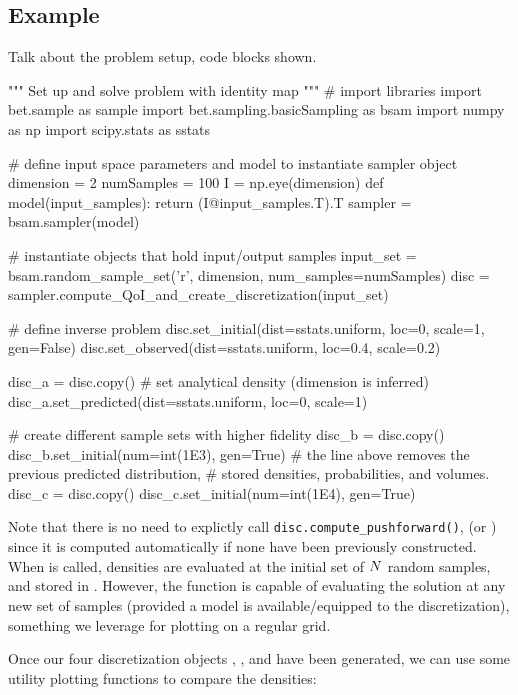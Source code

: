 \subsection{Example}\label{sec:sample-example}

Talk about the problem setup, code blocks shown.

\begin{python}
"""
Set up and solve problem with identity map
"""
# import libraries
import bet.sample as sample
import bet.sampling.basicSampling as bsam
import numpy as np
import scipy.stats as sstats

# define input space parameters and model to instantiate sampler object
dimension = 2
numSamples = 100
I = np.eye(dimension)
def model(input_samples):
        return (I@input_samples.T).T
sampler = bsam.sampler(model)

# instantiate objects that hold input/output samples
input_set = bsam.random_sample_set('r', dimension, num_samples=numSamples)
disc = sampler.compute_QoI_and_create_discretization(input_set)

# define inverse problem
disc.set_initial(dist=sstats.uniform, loc=0, scale=1, gen=False)
disc.set_observed(dist=sstats.uniform, loc=0.4, scale=0.2)

disc_a = disc.copy()
# set analytical density (dimension is inferred)
disc_a.set_predicted(dist=sstats.uniform, loc=0, scale=1)

# create different sample sets with higher fidelity
disc_b = disc.copy()
disc_b.set_initial(num=int(1E3), gen=True)
# the line above removes the previous predicted distribution,
#     stored densities, probabilities, and volumes.
disc_c = disc.copy()
disc_c.set_initial(num=int(1E4), gen=True)
\end{python}

Note that there is no need to explictly call {\tt disc.compute\_pushforward()}, (or ) since it is computed automatically if none have been previously constructed.
When  is called, densities are evaluated at the initial set of $N$ random samples, and stored in .
However, the function  is capable of evaluating the solution at any new set of samples (provided a model is available/equipped to the discretization), something we leverage for plotting on a regular grid.

Once our four discretization objects , ,  and  have been generated, we can use some utility plotting functions to compare the densities:

